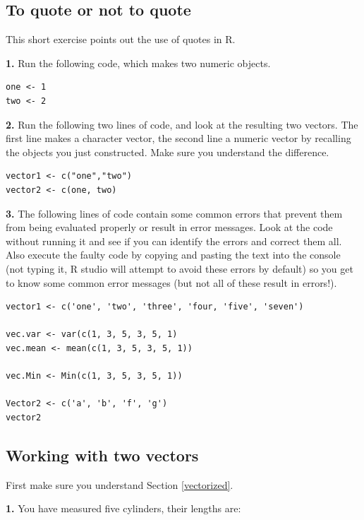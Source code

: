 \documentclass[]{book}
\begin{document}
\hypertarget{exquote}{%
\subsection{To quote or not to quote}\label{exquote}}

This short exercise points out the use of quotes in R.

\textbf{1.} Run the following code, which makes two numeric objects.

\begin{verbatim}
one <- 1
two <- 2
\end{verbatim}

\textbf{2.} Run the following two lines of code, and look at the resulting two vectors. The first line makes a character vector, the second line a numeric vector by recalling the objects you just constructed. Make sure you understand the difference.

\begin{verbatim}
vector1 <- c("one","two")
vector2 <- c(one, two)
\end{verbatim}

\textbf{3.} The following lines of code contain some common errors that prevent them from being evaluated properly or result in error messages. Look at the code without running it and see if you can identify the errors and correct them all. Also execute the faulty code by copying and pasting the text into the console (not typing it, R studio will attempt to avoid these errors by default) so you get to know some common error messages (but not all of these result in errors!).

\begin{verbatim}
vector1 <- c('one', 'two', 'three', 'four, 'five', 'seven')

vec.var <- var(c(1, 3, 5, 3, 5, 1)
vec.mean <- mean(c(1, 3, 5, 3, 5, 1))

vec.Min <- Min(c(1, 3, 5, 3, 5, 1))

Vector2 <- c('a', 'b', 'f', 'g')
vector2
\end{verbatim}

\hypertarget{working-with-two-vectors}{%
\subsection{Working with two vectors}\label{working-with-two-vectors}}

First make sure you understand Section \ref{vectorized}.

\textbf{1.} You have measured five cylinders, their lengths are:
\end{document}
